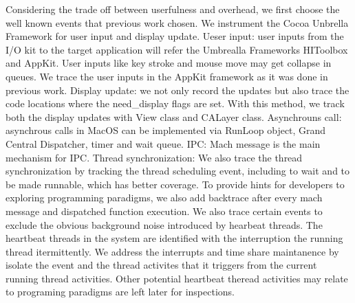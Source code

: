 Considering the trade off between userfulness and overhead, we first choose the well known events that previous work chosen.
We instrument the Cocoa Unbrella Framework for user input and display update.
Ueser input: user inputs from the I/O kit to the target application will refer the Umbrealla Frameworks HIToolbox and AppKit.
User inputs like key stroke and mouse move may get collapse in queues.
We trace the user inputs in the AppKit framework as it was done in previous work.
Display update: we not only record the updates but also trace the code locations where the need\_display flags are set. With this method, we track both the display updates with View class and CALayer class.
Asynchrouns call: asynchrous calls in MacOS can be implemented via RunLoop object, Grand Central Dispatcher, timer and wait queue.
IPC: Mach message is the main mechanism for IPC.
Thread synchronization: We also trace the thread synchronization by tracking the thread scheduling event, including to wait and to be made runnable, which has better coverage.
To provide hints for developers to exploring programming paradigms, we also add backtrace after every mach message and dispatched function execution.
We also trace certain events to exclude the obvious background noise introduced by hearbeat threads. 
The heartbeat threads in the system are identified with the interruption the running thread itermittently.
We address the interrupts and time share maintanence by isolate the event and the thread activites that it triggers from the current running thread activities.
Other potential heartbeat theread activities may relate to programing paradigms are left later for inspections.

